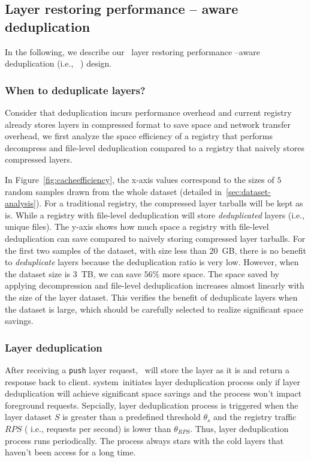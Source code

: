 \subsection{Layer restoring performance -- aware deduplication}
\label{sec:dedup-desgin}

In the following, we describe our \sysname~layer restoring performance --aware deduplication
 (i.e., \sysname~\dedupname) design. 

\subsubsection{When to deduplicate layers?}



Consider that deduplication incurs performance overhead and current registry already stores layers in compressed format to 
save space and network transfer overhead, 
 we first analyze the space efficiency of a registry 
 that performs decompress and file-level deduplication compared to 
 a registry that naively stores compressed layers.

In Figure~\ref{fig:cacheefficiency}, the x-axis values correspond to the sizes of $5$ random samples 
drawn from the whole dataset (detailed in~\cref{sec:dataset-analysis}). %
For a traditional registry, the compressed layer tarballs will be kept as is.
While a registry with file-level deduplication will store \emph{deduplicated} layers (i.e., unique files). 
The y-axis shows how much space a registry with file-level deduplication can save compared to naively storing compressed layer tarballs.
For the first two samples of the dataset, with size less than $20$~GB, 
there is no benefit to \emph{deduplicate} layers 
because the deduplication ratio is very low.
However, when the dataset size is $3$~TB, we can save $56\%$ more space.
The space saved by applying decompression and file-level deduplication increases almost linearly with the size of the layer dataset.
This verifies the benefit of deduplicate layers when the dataset is large, 
which should be carefully selected to realize significant space savings.

\subsubsection{Layer deduplication}

After receiving a \texttt{push} layer request, \sysname~will store the layer as it is and return a response back to client. 
\dedupname system~initiates layer deduplication process only if 
layer deduplication will achieve significant space savings and 
the process won't impact foreground requests. 
Sepcially, layer deduplication process is triggered when
the layer dataset $S$ is greater than a predefined threshold $\theta_{s}$ and 
the registry traffic $RPS$ ( i.e., requests per second) is lower than $\theta_{RPS}$. Thus, layer deduplication process runs periodically.
The process always stars with the cold layers that haven't been
access for a long time.
  
